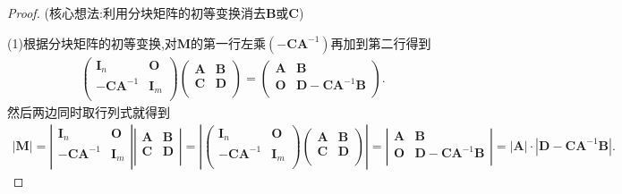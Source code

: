 \documentclass[../../main.tex]{subfiles}%
\begin{document}
\begin{proof}

(核心想法:利用分块矩阵的初等变换消去$\boldsymbol{B}$或$\boldsymbol{C}$)

(1)根据分块矩阵的初等变换,对$\boldsymbol{M}$的第一行左乘$(-\boldsymbol{CA}^{-1})$再加到第二行得到
\begin{align*}
\left( \begin{matrix}
\boldsymbol{I}_n&		\boldsymbol{O}\\
-\boldsymbol{CA}^{-1}&		\boldsymbol{I}_m\\
\end{matrix} \right) \left( \begin{matrix}
\boldsymbol{A}&		\boldsymbol{B}\\
\boldsymbol{C}&		\boldsymbol{D}\\
\end{matrix} \right) =\left( \begin{matrix}
\boldsymbol{A}&		\boldsymbol{B}\\
\boldsymbol{O}&		\boldsymbol{D}-\boldsymbol{CA}^{-1}\boldsymbol{B}\\
\end{matrix} \right) .
\end{align*}
然后两边同时取行列式就得到
\begin{align*}
\left| \boldsymbol{M} \right|=\left| \begin{matrix}
\boldsymbol{I}_n&		\boldsymbol{O}\\
-\boldsymbol{CA}^{-1}&		\boldsymbol{I}_m\\
\end{matrix} \right|\left| \begin{matrix}
\boldsymbol{A}&		\boldsymbol{B}\\
\boldsymbol{C}&		\boldsymbol{D}\\
\end{matrix} \right|=\left| \left( \begin{matrix}
\boldsymbol{I}_n&		\boldsymbol{O}\\
-\boldsymbol{CA}^{-1}&		\boldsymbol{I}_m\\
\end{matrix} \right) \left( \begin{matrix}
\boldsymbol{A}&		\boldsymbol{B}\\
\boldsymbol{C}&		\boldsymbol{D}\\
\end{matrix} \right) \right|=\left| \begin{matrix}
\boldsymbol{A}&		\boldsymbol{B}\\
\boldsymbol{O}&		\boldsymbol{D}-\boldsymbol{CA}^{-1}\boldsymbol{B}\\
\end{matrix} \right|=|\boldsymbol{A}|\cdot |\boldsymbol{D}-\boldsymbol{CA}^{-1}\boldsymbol{B}|.
\end{align*}


\end{proof}
\end{document}
